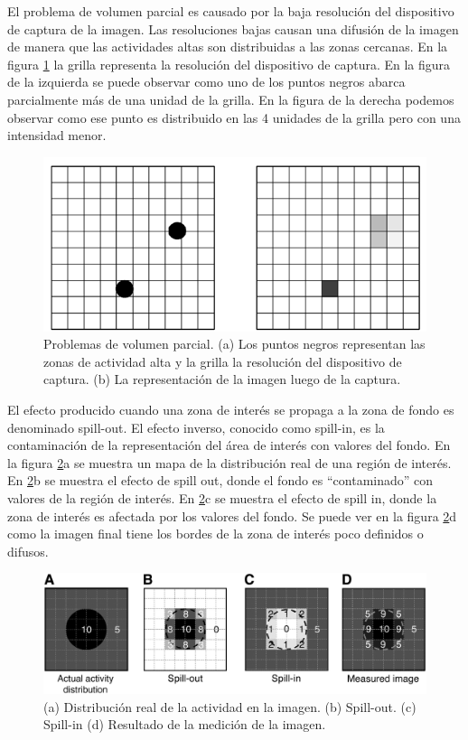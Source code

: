 El problema de volumen parcial es causado por la baja resolución del dispositivo de captura de la imagen. Las resoluciones bajas causan una difusión de la imagen de manera que las actividades altas son distribuidas a las zonas cercanas. En la figura \ref{fig:resolucion} la grilla representa la resolución del dispositivo de captura. En la figura de la izquierda se puede observar como uno de los puntos negros abarca parcialmente más de una unidad de la grilla. En la figura de la derecha podemos observar como ese punto es distribuido en las 4 unidades de la grilla pero con una intensidad menor.

\begin{figure}[H]
\centering
\includegraphics[scale=0.3]{images/resolution.png}
\caption{Problemas de volumen parcial. (a) Los puntos negros representan las zonas de actividad alta y la grilla la resolución del dispositivo de captura. (b) La representación de la imagen luego de la captura.}
\label{fig:resolucion}
\end{figure}

El efecto producido cuando una zona de interés se propaga a la zona de fondo es denominado spill-out. El efecto inverso, conocido como spill-in, es la contaminación de la representación del área de interés con valores del fondo. En la figura \ref{fig:spill}a se muestra un mapa de la distribución real de una región de interés. En \ref{fig:spill}b se muestra el efecto de spill out, donde el fondo es “contaminado” con valores de la región de interés. En \ref{fig:spill}c se muestra el efecto de spill in, donde la zona de interés es afectada por los valores del fondo. Se puede ver en la figura \ref{fig:spill}d como la imagen final tiene los bordes de la zona de interés poco definidos o difusos.

\begin{figure}[H]
\centering
\includegraphics[scale=0.2]{images/spill.jpg}
\caption{(a) Distribución real de la actividad en la imagen. (b) Spill-out. (c) Spill-in (d) Resultado de la medición de la imagen.}
\label{fig:spill}
\end{figure}

